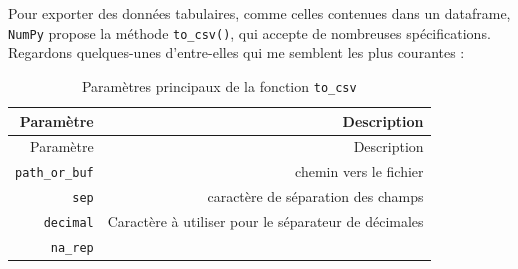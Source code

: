 \documentclass[12pt,]{book}
\numberwithin{equation}{section}
\numberwithin{countremarque}{section}
\begin{document}
Pour exporter des données tabulaires, comme celles contenues dans un
dataframe, \texttt{NumPy} propose la méthode \texttt{to\_csv()}, qui
accepte de nombreuses spécifications. Regardons quelques-unes
d'entre-elles qui me semblent les plus courantes :

\begin{longtable}[]{@{}rr@{}}
\caption{\label{tab:pandasto-csv} Paramètres principaux de la fonction
\texttt{to\_csv}}\tabularnewline
\toprule
\begin{minipage}[b]{0.22\columnwidth}\raggedleft\strut
Paramètre\strut
\end{minipage} & \begin{minipage}[b]{0.67\columnwidth}\raggedleft\strut
Description\strut
\end{minipage}\tabularnewline
\midrule
\endfirsthead
\toprule
\begin{minipage}[b]{0.22\columnwidth}\raggedleft\strut
Paramètre\strut
\end{minipage} & \begin{minipage}[b]{0.67\columnwidth}\raggedleft\strut
Description\strut
\end{minipage}\tabularnewline
\midrule
\endhead
\begin{minipage}[t]{0.22\columnwidth}\raggedleft\strut
\texttt{path\_or\_buf}\strut
\end{minipage} & \begin{minipage}[t]{0.67\columnwidth}\raggedleft\strut
chemin vers le fichier\strut
\end{minipage}\tabularnewline
\begin{minipage}[t]{0.22\columnwidth}\raggedleft\strut
\texttt{sep}\strut
\end{minipage} & \begin{minipage}[t]{0.67\columnwidth}\raggedleft\strut
caractère de séparation des champs\strut
\end{minipage}\tabularnewline
\begin{minipage}[t]{0.22\columnwidth}\raggedleft\strut
\texttt{decimal}\strut
\end{minipage} & \begin{minipage}[t]{0.67\columnwidth}\raggedleft\strut
Caractère à utiliser pour le séparateur de décimales\strut
\end{minipage}\tabularnewline
\begin{minipage}[t]{0.22\columnwidth}\raggedleft\strut
\texttt{na\_rep}\strut
\end{minipage} & \begin{minipage}[t]{0.67\columnwidth}\raggedleft\strut

\end{minipage}
\end{longtable}
\end{document}
